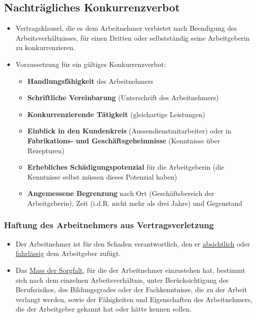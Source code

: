 \subsection{Nachträgliches Konkurrenzverbot}
\begin{itemize}
    \item Vertragsklausel, die es dem Arbeitnehmer verbietet nach Beendigung des Arbeitsverhältnisses, für einen Dritten oder selbstständig seine Arbeitgeberin zu konkurrenzieren.
    \item Voraussetzung für ein gültiges Konkurrenzverbot:
    \begin{itemize}
        \item \textbf{Handlungsfähigkeit} des Arbeitnehmers
        \item \textbf{Schriftliche Vereinbarung} (Unterschrift des Arbeitnehmers)
        \item \textbf{Konkurrenzierende Tätigkeit} (gleichartige Leistungen)
        \item \textbf{Einblick in den Kundenkreis} (Aussendienstmitarbeiter) oder in \textbf{Fabrikations- und Geschäftsgeheimnisse} (Kenntnisse über Rezepturen)
        \item \textbf{Erhebliches Schädigungspotenzial} für die Arbeitgeberin (die Kenntnisse selbst müssen dieses Potenzial haben)
        \item \textbf{Angemessene Begrenzung} nach Ort (Geschäftsbereich der Arbeitgeberin), Zeit (i.d.R. nicht mehr als drei Jahre) und Gegenstand
    \end{itemize}
\end{itemize}

\subsubsection{Haftung des Arbeitnehmers aus Vertragsverletzung}
\begin{itemize}
    \item Der Arbeitnehmer ist für den Schaden verantwortlich, den er \underline{absichtlich} oder \underline{fahrlässig} dem Arbeitgeber zufügt.
    \item Das \underline{Mass der Sorgfalt}, für die der Arbeitnehmer einzustehen hat, bestimmt sich nach dem einzelnen Arbeitsverhältnis, unter Berücksichtigung des Berufsrisikos, des Bildungsgrades oder der Fachkenntnisse, die zu der Arbeit verlangt werden, sowie der Fähigkeiten und Eigenschaften des Arbeitnehmers, die der Arbeitgeber gekannt hat oder hätte kennen sollen.
\end{itemize}

